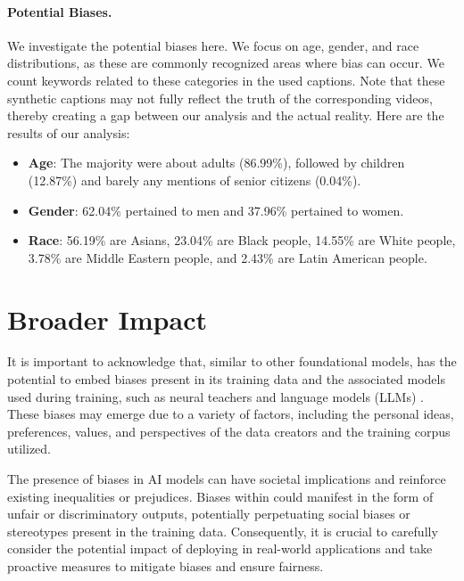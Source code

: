 \paragraph{Potential Biases.} We investigate the potential biases here. We focus on age, gender, and race distributions, as these are commonly recognized areas where bias can occur. 
We count keywords related to these categories in the used captions. Note that these synthetic captions may not fully reflect the truth of the corresponding videos, thereby creating a gap between our analysis and the actual reality. Here are the results of our analysis:
\begin{itemize}[leftmargin=*]
\item[$\bullet$] \textbf{Age}: The majority were about adults (86.99\%), followed by children (12.87\%) and barely any mentions of senior citizens (0.04\%).
\item[$\bullet$] \textbf{Gender}: 62.04\% pertained to men and 37.96\% pertained to women.
\item[$\bullet$] \textbf{Race}: 56.19\% are Asians, 23.04\% are Black people, 14.55\% are White people, 3.78\% are Middle Eastern people, and 2.43\% are Latin American people.
\end{itemize}

\section{Broader Impact}
It is important to acknowledge that, similar to other foundational models, {\modelname} has the potential to embed biases present in its training data and the associated models used during training, such as neural teachers \cite{videomae,chen2023internvl} and language models (LLMs) \cite{mistral,vicuna}. These biases may emerge due to a variety of factors, including the personal ideas, preferences, values, and perspectives of the data creators and the training corpus utilized.

The presence of biases in AI models can have societal implications and reinforce existing inequalities or prejudices. Biases within {\modelname} could manifest in the form of unfair or discriminatory outputs, potentially perpetuating social biases or stereotypes present in the training data. Consequently, it is crucial to carefully consider the potential impact of deploying {\modelname} in real-world applications and take proactive measures to mitigate biases and ensure fairness.